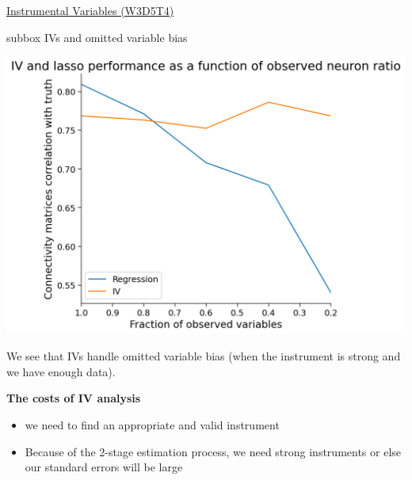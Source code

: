 \begin{textbox}{\href{https://compneuro.neuromatch.io/tutorials/W3D5_NetworkCausality/student/W3D5_Tutorial4.html}{Instrumental Variables (W3D5T4)}   }
\begin{subbox}{subbox}{ IVs and omitted variable bias
}
\begin{center}
\includegraphics[scale=0.2]{Figures/NC/NC_Figure23.png}

\end{center}

We see that IVs handle omitted variable bias (when the instrument is strong and we have enough data).

\textbf{The costs of IV analysis}
\begin{itemize}
    

\item  we need to find an appropriate and valid instrument
\item  Because of the 2-stage estimation process, we need strong instruments or else our standard errors will be large
\end{itemize}
\end{subbox}
\end{textbox}
